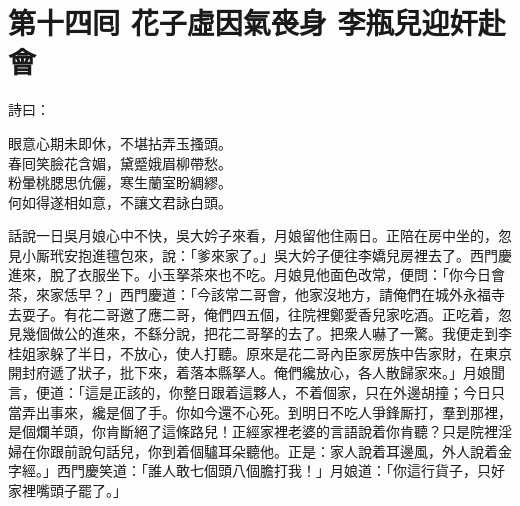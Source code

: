 
\chapter*{第十四囘 花子虛因氣䘮身 李瓶兒迎奸赴會}


詩曰：

\begin{myquote}
眼意心期未即休，不堪拈弄玉搔頭。\\春囘笑臉花含媚，黛蹙娥眉柳帶愁。\\粉暈桃腮思伉儷，寒生蘭室盼綢繆。\\何如得遂相如意，不讓文君詠白頭。
\end{myquote}

話說一日吳月娘心中不快，吳大妗子來看，月娘留他住兩日。正陪在房中坐的，忽見小厮玳安抱進氊包來，說：「爹來家了。」吳大妗子便往李嬌兒房裡去了。西門慶進來，脫了衣服坐下。小玉拏茶來也不吃。月娘見他面色改常，便問：「你今日會茶，來家恁早？」西門慶道：「今該常二哥會，他家沒地方，請俺們在城外永福寺去耍子。有花二哥邀了應二哥，俺們四五個，往院裡鄭愛香兒家吃酒。正吃着，忽見幾個做公的進來，不繇分說，把花二哥拏的去了。把衆人嚇了一驚。我便走到李桂姐家躲了半日，不放心，使人打聽。原來是花二哥內臣家房族中告家財，在東京開封府遞了狀子，批下來，着落本縣拏人。俺們纔放心，各人散歸家來。」月娘聞言，便道：「這是正該的，你整日跟着這夥人，不着個家，只在外邊胡撞；今日只當弄出事來，纔是個了手。你如今還不心死。到明日不吃人爭鋒厮打，羣到那裡，是個爛羊頭，你肯斷絕了這條路兒！正經家裡老婆的言語說着你肯聽？只是院裡淫婦在你跟前說句話兒，你到着個驢耳朵聽他。正是：家人說着耳邊風，外人說着金字經。」西門慶笑道：「誰人敢七個頭八個膽打我！」{}月娘道：「你這行貨子，只好家裡嘴頭子罷了。」

